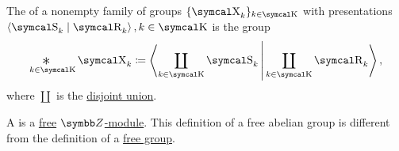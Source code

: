 \begin{definition}\label{def:group_free_product}
  The  of a nonempty family of groups \( \{ \CX_k \}_{k \in \CK} \) with presentations \( \Braket{\CS_k \mid \CR_k}, k \in \CK \) is the group
  \begin{equation*}
    \Ast_{k \in \CK} \CX_k \coloneqq \Braket{ \coprod_{k \in \CK} \CS_k | \coprod_{k \in \CK} \CR_k },
  \end{equation*}
  where \( \coprod \) is the \hyperref[def:disjoint_union]{disjoint union}.
\end{definition}

\begin{definition}\label{def:free_abelian_group}
  A  is a \hyperref[def:free_left_module]{free} \hyperref[thm:abelian_group_iff_z_module]{\( \BZ \)-module}. This definition of a free abelian group is different from the definition of a \hyperref[def:free_group]{free group}.
\end{definition}
